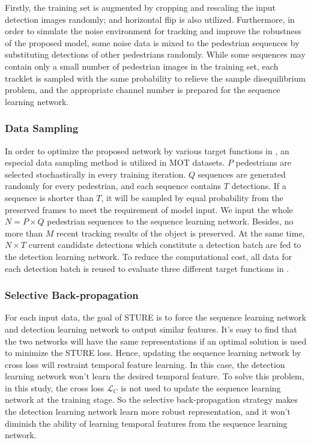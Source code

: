 \documentclass[times,twocolumn,final,authoryear]{elsarticle}
\begin{document}
Firstly, the training set is augmented by cropping and rescaling the input detection images randomly;
and horizontal flip is also utilized.
Furthermore, in order to simulate the noise environment for tracking and improve the robustness of the proposed model,
some noise data is mixed to the pedestrian sequences by substituting detections of other pedestrians randomly.
While some sequences may contain only a small number of pedestrian images in the training set, 
each tracklet is sampled with the same probability to relieve the sample disequilibrium problem,
and the appropriate channel number is prepared for the sequence learning network.

\vspace{5pt}
\noindent
\subsubsection{Data Sampling}
\label{sec:sampling}
In order to optimize the proposed network by various target functions in , an especial data sampling method is utilized in MOT datasets.
$P$ pedestrians are selected stochastically in every training iteration.
$Q$ sequences are generated randomly for every pedestrian, 
and each sequence contains $T$ detections. 
If a sequence is shorter than $T$, {it} will be sampled by equal probability from the preserved frames to meet the requirement of model input.
We input the whole $N=P\times Q$ pedestrian sequences to the sequence learning network.
Besides, no more than $M$ recent tracking results of the object is preserved.
At the same time, $N\times T$ current candidate detections which constitute a detection batch are fed to the detection learning network.
To reduce the computational cost, all data for each detection batch is reused to evaluate three different target functions in .

\vspace{5pt}
\noindent
\subsubsection{Selective Back-propagation}
For each input data, the goal of STURE is to force the sequence learning network and detection learning network to output similar features.
It's easy to find that the two networks will have the same representations if an optimal solution is used to minimize the STURE loss.
Hence, updating the sequence learning network by cross loss will restraint temporal feature learning.
In this case, the detection learning network won't learn the desired temporal feature.
To solve this problem, in this study, the cross loss $\mathcal{L}_{C}$ is not used to update the sequence learning network at the training stage.
So the selective back-propagation strategy makes the detection learning network learn more robust representation, 
and it won't diminish the ability of learning temporal features from the sequence learning network.
\end{document}
